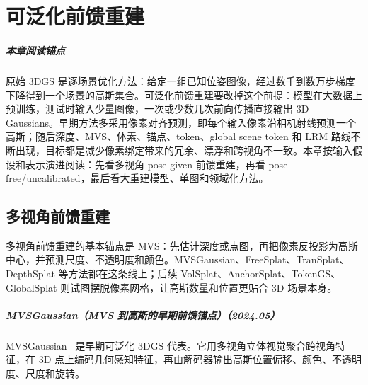\chapter{可泛化前馈重建}

\paragraph*{本章阅读锚点}
原始 3DGS 是逐场景优化方法：给定一组已知位姿图像，经过数千到数万步梯度下降得到一个场景的高斯集合。可泛化前馈重建要改掉这个前提：模型在大数据上预训练，测试时输入少量图像，一次或少数几次前向传播直接输出 3D Gaussians。早期方法多采用像素对齐预测，即每个输入像素沿相机射线预测一个高斯；随后深度、MVS、体素、锚点、token、global scene token 和 LRM 路线不断出现，目标都是减少像素绑定带来的冗余、漂浮和跨视角不一致。本章按输入假设和表示演进阅读：先看多视角 pose-given 前馈重建，再看 pose-free/uncalibrated，最后看大重建模型、单图和领域化方法。

\section{多视角前馈重建}

多视角前馈重建的基本锚点是 MVS：先估计深度或点图，再把像素反投影为高斯中心，并预测尺度、不透明度和颜色。MVSGaussian、FreeSplat、TranSplat、DepthSplat 等方法都在这条线上；后续 VolSplat、AnchorSplat、TokenGS、GlobalSplat 则试图摆脱像素网格，让高斯数量和位置更贴合 3D 场景本身。



\paragraph{MVSGaussian（MVS 到高斯的早期前馈锚点）（2024.05）}
MVSGaussian~\cite{2405_12218} 是早期可泛化 3DGS 代表。它用多视角立体视觉聚合跨视角特征，在 3D 点上编码几何感知特征，再由解码器输出高斯位置偏移、颜色、不透明度、尺度和旋转。

